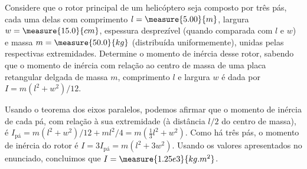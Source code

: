 \begin{question}
    Considere que o rotor principal de um helicóptero seja composto por três pás, cada uma delas com comprimento $l = \measure{5.00}{m}$, largura $w = \measure{15.0}{cm}$, espessura desprezível (quando comparada com $l$ e $w$) e massa $m = \measure{50.0}{kg}$ (distribuída uniformemente), unidas pelas respectivas extremidades.
    Determine o momento de inércia desse rotor, sabendo que o momento de inércia com relação ao centro de massa de uma placa retangular delgada de massa $m$, comprimento $l$ e largura $w$ é dada por $I = m(l^2+w^2)/12$.

    \begin{answer}
    \end{answer}

    \begin{solution}
      Usando o teorema dos eixos paralelos, podemos afirmar que o momento de inércia de cada pá, com relação à sua extremidade (à distância $l/2$ do centro de massa), é $I_{\text{pá}} = m(l^2+w^2)/12 + ml^2/4 = m(\frac{1}{3} l^2 + w^2)$.
      Como há três pás, o momento de inércia do rotor é $I = 3I_{\text{pá}} = m(l^2 + 3w^2)$.
      Usando os valores apresentados no enunciado, concluimos que $I = \measure{1.25e3}{kg.m^2}$.
    \end{solution}
\end{question}